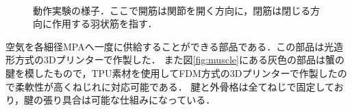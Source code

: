 \documentclass{jarticle}
\begin{document}
\vspace*{-4mm}
\begin{figure}[t]
  \centering
  \\
  \label{fig:move1}
  \vspace{-2mm}
  \label{fig:move2} 
  \vspace{-2mm}
  \label{fig:move3} 
  \vspace{-2mm}
  \caption{動作実験の様子．ここで開筋は関節を開く方向に，閉筋は閉じる方向に作用する羽状筋を指す．}
  \label{fig:jikken}
  \vspace{-2mm}
\end{figure}
\noindent
空気を各細径MPAへ一度に供給することができる部品である．この部品は光造形方式の3Dプリンターで作製した．
また図\ref{fig:muscle}にある灰色の部品は蟹の腱を模したもので，TPU素材を使用してFDM方式の3Dプリンターで作製したので柔軟性が高くねじれに対応可能である．
腱と外骨格は全てねじで固定しており，腱の張り具合は可能な仕組みになっている．
\end{document}
